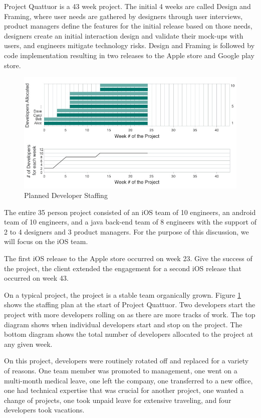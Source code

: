 Project Quattuor is a 43 week project. The initial 4 weeks are called Design and Framing, where user needs are gathered by designers through user interviews, product managers define the features for the initial release based on those needs, designers create an initial interaction design and validate their mock-ups with users, and engineers mitigate technology risks. Design and Framing is followed by code implementation resulting in two releases to the Apple store and Google play store.

\begin{figure}[t]
\centering
\includegraphics[width=7.1in]{OriginalDeveloperStaffing.jpg}
\caption{Planned Developer Staffing}
\label{PlannedDeveloperStaffing}
\end{figure}

The entire 35 person project consisted of an iOS team of 10 engineers, an android team of 10 engineers, and a java back-end team of 8 engineers with the support of 2 to 4 designers and 3 product managers. For the purpose of this discussion, we will focus on the iOS team. 

The first iOS release to the Apple store occurred on week 23. Give the success of the project, the client extended the engagement for a second iOS release that occurred on week 43. 

On a typical project, the project is a stable team organically grown. Figure \ref{PlannedDeveloperStaffing} shows the staffing plan at the start of Project Quattuor. Two developers start the project with more developers rolling on as there are more tracks of work. The top diagram shows when individual developers start and stop on the project. The bottom diagram shows the total number of developers allocated to the project at any given week. 

On this project, developers were routinely rotated off and replaced for a variety of reasons. One team member was promoted to management, one went on a multi-month medical leave, one left the company, one transferred to a new office, one had technical expertise that was crucial for another project, one wanted a change of projects, one took unpaid leave for extensive traveling, and four developers took vacations. 

